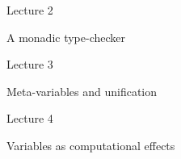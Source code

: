 \documentclass[10pt]{beamer}
\begin{document}
\begin{frame}
  \begin{center}
    \Huge Lecture 2

    \bigskip

    \Large
    A monadic type-checker
  \end{center}
\end{frame}




\begin{frame}
  \begin{center}
    \Huge Lecture 3

    \bigskip

    \Large
    Meta-variables and unification
  \end{center}
\end{frame}



\begin{frame}
  \begin{center}
    \Huge Lecture 4

    \bigskip

    \Large
    Variables as computational effects
  \end{center}
\end{frame}

\end{document}
